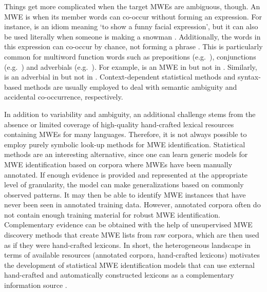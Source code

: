 \documentclass[output=paper,
modfonts
]{langscibook}
\begin{document}
Things get more complicated when the target MWEs are ambiguous, though. An MWE is  when its member words can co-occur without forming an expression. 
For instance,  is an idiom meaning `to show a funny facial expression', but it can also be used literally when someone is making a snowman \citep{fazly-cook-stevenson:2009:CL}. 
Additionally, the words in this expression can co-occur by chance, not forming a phrase \citep{BoukobzaR09,shigeto-EtAl:2013:MWE}. This is particularly common for multiword function words such as prepositions (e.g.\ ), conjunctions (e.g.\ ) and adverbials (e.g.\ ). 
For example,  is an MWE in  but not in . 
Similarly,  is an adverbial in  but not in .
Context-dependent statistical methods \citep{fazly-cook-stevenson:2009:CL,BoukobzaR09} and syntax-based methods \citep{candito-constant:acl:2014,nasr:acl:2015} are usually employed to deal with semantic ambiguity and accidental co-occurrence, respectively.

In addition to variability and ambiguity, an additional challenge stems from the absence or limited coverage of high-quality hand-crafted lexical resources containing MWEs for many languages.
Therefore, it is not always possible to employ purely symbolic look-up methods for MWE identification.
Statistical methods are an interesting alternative, since one can learn generic models for MWE identification based on corpora where MWEs have been manually annotated.
If enough evidence is provided and represented at the appropriate level of granularity, the model can make generalizations based on commonly observed patterns. It may then be able to identify MWE instances that have never been seen in annotated training data.
However, annotated corpora often do not contain enough training material for robust MWE identification. 
Complementary evidence can be obtained with the help of unsupervised MWE discovery methods that create MWE lists from raw corpora, which are then used as if they were hand-crafted lexicons.
In short, the heterogeneous landscape in terms of available resources (annotated corpora, hand-crafted lexicons) motivates the development of statistical MWE identification models that can use external hand-crafted and automatically constructed lexicons as a complementary information source \citep{constant-sigogne:2011:MWE,Schneider14b,riedl-biemann:2016:MWE}.
\end{document}
